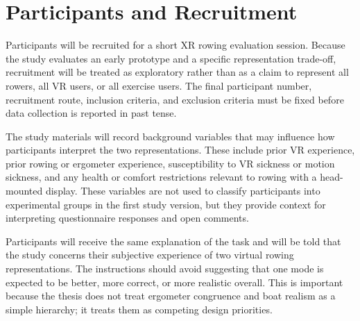 \section{Participants and Recruitment}
\label{sec:study_design_participants}

Participants will be recruited for a short XR rowing evaluation session. Because the study evaluates an early prototype and a specific representation trade-off, recruitment will be treated as exploratory rather than as a claim to represent all rowers, all VR users, or all exercise users. The final participant number, recruitment route, inclusion criteria, and exclusion criteria must be fixed before data collection is reported in past tense.


The study materials will record background variables that may influence how participants interpret the two representations. These include prior VR experience, prior rowing or ergometer experience, susceptibility to VR sickness or motion sickness, and any health or comfort restrictions relevant to rowing with a head-mounted display. These variables are not used to classify participants into experimental groups in the first study version, but they provide context for interpreting questionnaire responses and open comments.

Participants will receive the same explanation of the task and will be told that the study concerns their subjective experience of two virtual rowing representations. The instructions should avoid suggesting that one mode is expected to be better, more correct, or more realistic overall. This is important because the thesis does not treat ergometer congruence and boat realism as a simple hierarchy; it treats them as competing design priorities.

